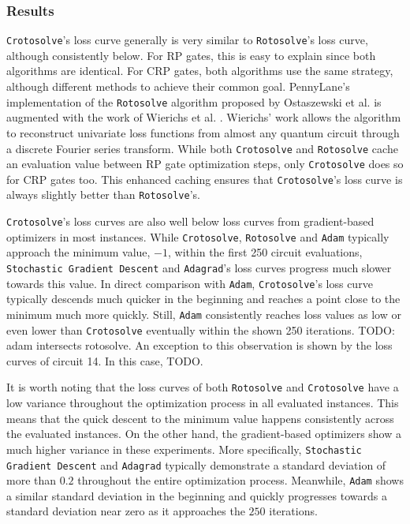
\subsubsection*{Results}

\texttt{Crotosolve}'s loss curve generally is very similar to
\texttt{Rotosolve}'s loss curve, although consistently below.
For RP gates, this is easy to explain since both algorithms are identical.
For CRP gates, both algorithms use the same strategy, although different methods
to achieve their common goal.
PennyLane's implementation of the \texttt{Rotosolve} algorithm proposed by
Ostaszewski et al. is augmented with the work of Wierichs et al.
\cite{ostaszewski_structure_2021,wierichs_general_2022,bergholm_pennylane_2018}.
Wierichs' work allows the algorithm to reconstruct univariate loss functions
from almost any quantum circuit through a discrete Fourier series transform.
While both \texttt{Crotosolve} and \texttt{Rotosolve} cache an evaluation value
between RP gate optimization steps, only \texttt{Crotosolve} does so for
CRP gates too.
This enhanced caching ensures that \texttt{Crotosolve}'s loss curve is always
slightly better than \texttt{Rotosolve}'s.

\texttt{Crotosolve}'s loss curves are also well below loss curves from
gradient-based optimizers in most instances.
While \texttt{Crotosolve}, \texttt{Rotosolve} and \texttt{Adam} typically
approach the minimum value, $-1$, within the first 250 circuit evaluations,
\texttt{Stochastic Gradient Descent} and \texttt{Adagrad}'s loss curves progress
much slower towards this value.
In direct comparison with \texttt{Adam}, \texttt{Crotosolve}'s loss curve
typically descends much quicker in the beginning and reaches a point close to
the minimum much more quickly.
Still, \texttt{Adam} consistently reaches loss values as low or even lower than
\texttt{Crotosolve} eventually within the shown 250 iterations.
TODO: adam intersects rotosolve.
An exception to this observation is shown by the loss curves of circuit 14.
In this case, TODO.

It is worth noting that the loss curves of both \texttt{Rotosolve} and
\texttt{Crotosolve} have a low variance throughout the optimization process in
all evaluated instances.
This means that the quick descent to the minimum value happens consistently
across the evaluated instances.
On the other hand, the gradient-based optimizers show a much higher variance in
these experiments.
More specifically, \texttt{Stochastic Gradient Descent} and \texttt{Adagrad}
typically demonstrate a standard deviation of more than $0.2$ throughout the
entire optimization process.
Meanwhile, \texttt{Adam} shows a similar standard deviation in the beginning and
quickly progresses towards a standard deviation near zero as it approaches the
$250$ iterations.

